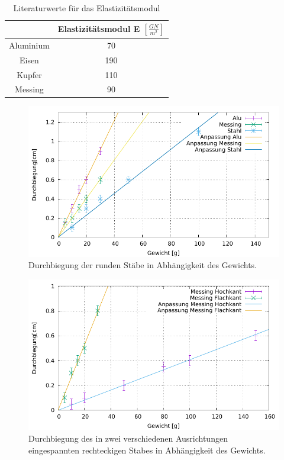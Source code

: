 \begin{table}[h]
	\caption{Literaturwerte für das Elastizitätsmodul \protect\footnotemark}
	\centering
	\begin{tabular}{|c|c|}
		\hline
		& Elastizitätsmodul E $\left[\frac{GN}{m^2}\right]$\\
		\hline
		Aluminium & 70 \\
		\hline
		Eisen & 190 \\
		\hline
		Kupfer & 110 \\
		\hline
		Messing & 90 \\
		\hline
	\end{tabular}
	\label{tab:ElaLit}
\end{table}

\begin{figure}[h]
	\centering
	\includegraphics[width=1\textwidth]{res/Rund.pdf}
	\caption{Durchbiegung der runden Stäbe in Abhängigkeit des Gewichts.}
	\label{figdurchbiegungRund}
\end{figure}

\begin{figure}[h]
	\centering
	\includegraphics[width=1\textwidth]{res/Eckig.pdf}
	\caption{Durchbiegung des in zwei verschiedenen Ausrichtungen eingespannten rechteckigen Stabes in Abhängigkeit des Gewichts.}
	\label{fig:durchbiegungEckig}
\end{figure}



